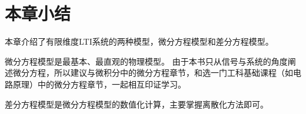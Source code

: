 \section{本章小结}

本章介绍了有限维度LTI系统的两种模型，微分方程模型和差分方程模型。

微分方程模型是最基本、最直观的物理模型。
由于本书只从信号与系统的角度阐述微分方程，所以建议与微积分中的微分方程章节，和选一门工科基础课程（如电路原理）中的微分方程章节，一起相互印证学习。

差分方程模型是微分方程模型的数值化计算，主要掌握离散化方法即可。




